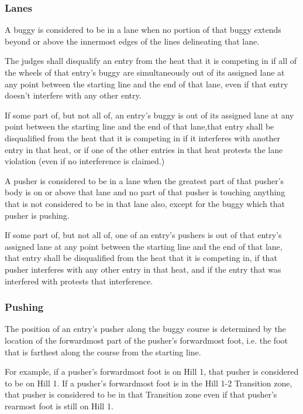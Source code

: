 \subsubsection{Lanes}

	A buggy is considered to be in a lane when no portion of that buggy extends beyond or above the innermost edges of the lines delineating that lane.

	The judges shall disqualify an entry from the heat that it is competing in if all of the wheels of that entry's buggy are simultaneously out of its assigned lane at any point between the starting line and the end of that lane, even if that entry doesn't interfere with any other entry.

	If some part of, but not all of, an entry's buggy is out of its assigned lane at any point between the starting line and the end of that lane,that entry shall be disqualified from the heat that it is competing in if it interferes with another entry in that heat, or if one of the other entries in that heat protests the lane violation (even if no interference is claimed.)

	A pusher is considered to be in a lane when the greatest part of that pusher's body is on or above that lane and no part of that pusher is touching anything that is not considered to be in that lane also, except for the buggy which that pusher is pushing.

	If some part of, but not all of, one of an entry's pushers is out of that entry's assigned lane at any point between the starting line and the end of that lane, that entry shall be disqualified from the heat that it is competing in, if that pusher interferes with any other entry in that heat, and if the entry that was interfered with protests that interference.

\subsubsection{Pushing}

	The position of an entry's pusher along the buggy course is determined by the location of the forwardmost part of the pusher's forwardmost foot, i.e. the foot that is farthest along the course from the starting line.

	For example, if a pusher's forwardmost foot is on Hill 1, that pusher is considered to be on Hill 1. If a pusher's forwardmost foot is in the Hill 1-2 Transition zone, that pusher is considered to be in that Transition zone even if that pusher's rearmost foot is still on Hill 1.

